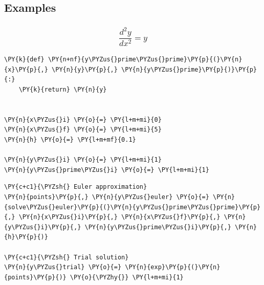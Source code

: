     \hypertarget{examples}{%
\subsection{Examples}\label{examples}}

    \hypertarget{fracd2ydx2-y}{%
\subsubsection{\texorpdfstring{\[\frac{d^2y}{dx^2} = y\]}{\textbackslash frac\{d\^{}2y\}\{dx\^{}2\} = y}}\label{fracd2ydx2-y}}

    \begin{tcolorbox}[breakable, size=fbox, boxrule=1pt, pad at break*=1mm,colback=cellbackground, colframe=cellborder]
\begin{Verbatim}[commandchars=\\\{\}]
\PY{k}{def} \PY{n+nf}{y\PYZus{}prime\PYZus{}prime}\PY{p}{(}\PY{n}{x}\PY{p}{,} \PY{n}{y}\PY{p}{,} \PY{n}{y\PYZus{}prime}\PY{p}{)}\PY{p}{:}
    \PY{k}{return} \PY{n}{y}


\PY{n}{x\PYZus{}i} \PY{o}{=} \PY{l+m+mi}{0}
\PY{n}{x\PYZus{}f} \PY{o}{=} \PY{l+m+mi}{5}
\PY{n}{h} \PY{o}{=} \PY{l+m+mf}{0.1}

\PY{n}{y\PYZus{}i} \PY{o}{=} \PY{l+m+mi}{1}
\PY{n}{y\PYZus{}prime\PYZus{}i} \PY{o}{=} \PY{l+m+mi}{1}
\end{Verbatim}
\end{tcolorbox}

    \begin{tcolorbox}[breakable, size=fbox, boxrule=1pt, pad at break*=1mm,colback=cellbackground, colframe=cellborder]
\begin{Verbatim}[commandchars=\\\{\}]
\PY{c+c1}{\PYZsh{} Euler approximation}
\PY{n}{points}\PY{p}{,} \PY{n}{y\PYZus{}euler} \PY{o}{=} \PY{n}{solve\PYZus{}euler}\PY{p}{(}\PY{n}{y\PYZus{}prime\PYZus{}prime}\PY{p}{,} \PY{n}{x\PYZus{}i}\PY{p}{,} \PY{n}{x\PYZus{}f}\PY{p}{,} \PY{n}{y\PYZus{}i}\PY{p}{,} \PY{n}{y\PYZus{}prime\PYZus{}i}\PY{p}{,} \PY{n}{h}\PY{p}{)}

\PY{c+c1}{\PYZsh{} Trial solution}
\PY{n}{y\PYZus{}trial} \PY{o}{=} \PY{n}{exp}\PY{p}{(}\PY{n}{points}\PY{p}{)} \PY{o}{\PYZhy{}} \PY{l+m+mi}{1}
\end{Verbatim}
\end{tcolorbox}

